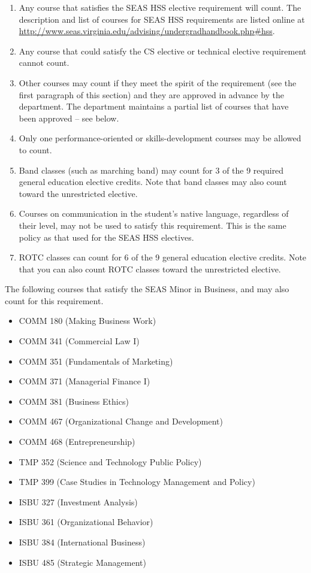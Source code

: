 \documentclass[12pt,twoside]{article}
\newenvironment{itemlist}{
\begin{itemize}
\setlength{\itemsep}{0pt}
\setlength{\parskip}{0pt}}
{\end{itemize}}
\begin{document}
\begin{enumerate}

\item Any course that satisfies the SEAS HSS elective requirement will
count. The description and list of courses for SEAS HSS requirements
are listed online at
\url{http://www.seas.virginia.edu/advising/undergradhandbook.php#hss}.

\item Any course that could satisfy the CS elective or technical
elective requirement cannot count.

\item Other courses may count if they meet the spirit of the
requirement (see the first paragraph of this section) and they are
approved in advance by the department. The department maintains a
partial list of courses that have been approved -- see below.

\item Only one performance-oriented or skills-development courses may
be allowed to count.

\item Band classes (such as marching band) may count for 3 of the 9
required general education elective credits.  Note that band classes
may also count toward the unrestricted elective.

\item Courses on communication in the student's native language,
regardless of their level, may not be used to satisfy this
requirement.  This is the same policy as that used for the SEAS HSS
electives.

\item ROTC classes can count for 6 of the 9 general education elective
credits.  Note that you can also count ROTC classes toward the
unrestricted elective.

\end{enumerate}


The following courses that satisfy the SEAS Minor in Business, and may
also count for this requirement.

\begin{itemlist}
\item COMM 180 (Making Business Work)
\item COMM 341 (Commercial Law I)
\item COMM 351 (Fundamentals of Marketing)
\item COMM 371 (Managerial Finance I)
\item COMM 381 (Business Ethics)
\item COMM 467 (Organizational Change and Development)
\item COMM 468 (Entrepreneurship)
\item TMP 352 (Science and Technology Public Policy)
\item TMP 399 (Case Studies in Technology Management and Policy)
\item ISBU 327 (Investment Analysis)
\item ISBU 361 (Organizational Behavior)
\item ISBU 384 (International Business)
\item ISBU 485 (Strategic Management)
\end{itemlist}
\end{document}
